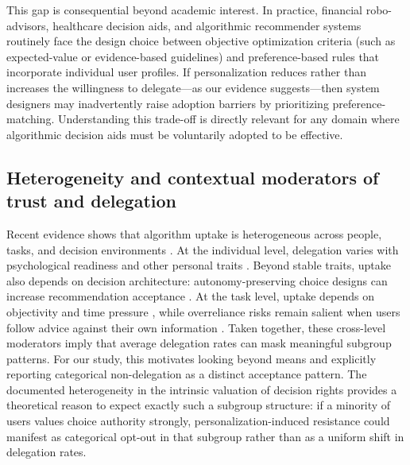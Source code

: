 \documentclass[a4paper, 12pt, fleqn]{article}
\theoremstyle{definition}
\begin{document}
This gap is consequential beyond academic interest. In practice, financial robo-advisors, healthcare decision aids, and algorithmic recommender systems routinely face the design choice between objective optimization criteria (such as expected-value or evidence-based guidelines) and preference-based rules that incorporate individual user profiles. If personalization reduces rather than increases the willingness to delegate---as our evidence suggests---then system designers may inadvertently raise adoption barriers by prioritizing preference-matching. Understanding this trade-off is directly relevant for any domain where algorithmic decision aids must be voluntarily adopted to be effective.

\subsection{Heterogeneity and contextual moderators of trust and delegation}
Recent evidence shows that algorithm uptake is heterogeneous across people, tasks, and decision environments \citep{Ferraz2025,Yang2025}. At the individual level, delegation varies with psychological readiness and other personal traits \citep{Kim2026}. Beyond stable traits, uptake also depends on decision architecture: autonomy-preserving choice designs can increase recommendation acceptance \citep{Fink2024}. At the task level, uptake depends on objectivity and time pressure \citep{Yang2025}, while overreliance risks remain salient when users follow advice against their own information \citep{Klingbeil2024}. Taken together, these cross-level moderators imply that average delegation rates can mask meaningful subgroup patterns. For our study, this motivates looking beyond means and explicitly reporting categorical non-delegation as a distinct acceptance pattern. The documented heterogeneity in the intrinsic valuation of decision rights \citep{Bartling2014,Owens2014} provides a theoretical reason to expect exactly such a subgroup structure: if a minority of users values choice authority strongly, personalization-induced resistance could manifest as categorical opt-out in that subgroup rather than as a uniform shift in delegation rates.
\end{document}
